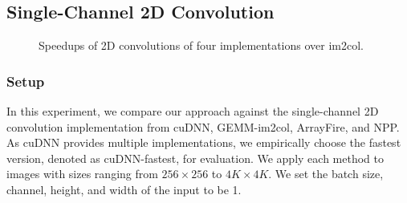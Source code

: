 \subsection{Single-Channel 2D Convolution\label{sec:ex2dc}}
\begin{figure}
\centering
{}
\hspace{0em}
	
\caption{Speedups of 2D convolutions of four implementations over im2col.}
\label{fig:2druntime}
\end{figure}


\subsubsection{Setup}
In this experiment, we compare our approach against the single-channel 2D convolution implementation from cuDNN, GEMM-im2col, ArrayFire,
and NPP. As cuDNN provides multiple implementations, we empirically choose the fastest version, denoted as cuDNN-fastest, for evaluation.
We apply each method to images with sizes ranging from $256 \times 256$ to $4K \times 4K$. We set the batch size, channel, height, and
width of the input to be 1.


